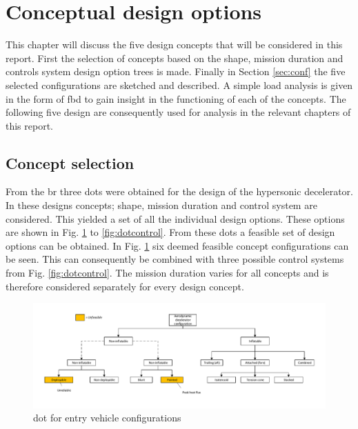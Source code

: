 \section{Conceptual design options} \label{ch:options}
This chapter will discuss the five design concepts that will be considered in this report. First the selection of concepts based on the shape, mission duration and controls system design option trees is made. Finally in Section \ref{sec:conf} the five selected configurations are sketched and described. A simple load analysis is given in the form of \gls{fbd} to gain insight in the functioning of each of the concepts. The following five design are consequently used for analysis in the relevant chapters of this report.

\subsection{Concept selection}
 From the \acrfull{br} three \glspl{dot} were obtained for the design of the hypersonic decelerator. In these designs concepts; shape, mission duration and control system are considered. This yielded a set of all the individual design options. These options are shown in Fig. \ref{fig:dotshape} to \ref{fig:dotcontrol}. From these \glspl{dot} a feasible set of design options can be obtained. In Fig. \ref{fig:dotshape} six deemed feasible concept configurations  can be seen. This can consequently be combined with three possible control systems from Fig. \ref{fig:dotcontrol}. The mission duration varies for all concepts and is therefore considered separately for every design concept. 

\begin{figure}[H]
\hspace{-23mm}
\includegraphics[width = 1.25\textwidth]{Figure/DOT_configuration.pdf}
\vspace{-5mm}
\caption{\acrlong{dot} for entry vehicle configurations}
\label{fig:dotshape}
\end{figure}

